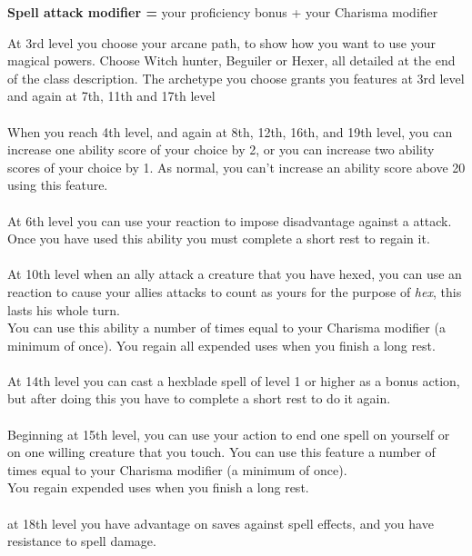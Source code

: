 \documentclass[a4paper]{article}
\begin{document}
\begin{multicols}{2}
\begin{center}
\textbf{Spell attack modifier =} your proficiency bonus + your Charisma modifier\\
\end{center} 
At 3rd level you choose your arcane path, to show how you want to use your magical powers. Choose Witch hunter, Beguiler or Hexer, all detailed at the end of the class description. The archetype you choose grants you features at 3rd level and again at 7th, 11th and 17th level\\
\\
When you reach 4th level, and again at 8th, 12th, 16th, and 19th level, you can increase one ability score of your choice by 2, or you can increase two ability scores of your choice by 1. As normal, you can’t increase an ability score above 20 using this feature.\\
\\
At 6th level you can use your reaction to impose disadvantage against a attack.\\
Once you have used this ability you must complete a short rest to regain it.\\
\\
At 10th level when an ally attack a creature that you have hexed, you can use an reaction to cause your allies attacks to count as yours for the purpose of \textit{hex}, this lasts his whole turn.\\
You can use this ability a number of times equal to your Charisma modifier (a minimum of once). You regain all expended uses when you finish a long rest.\\
\\
At 14th level you can cast a hexblade spell of level 1 or higher as a bonus action, but after doing this you have to complete a short rest to do it again.\\
\\
Beginning at 15th level, you can use your action to end one spell on yourself or on one willing creature that you touch. You can use this feature a number of times equal to your Charisma modifier (a minimum of once).\\
You regain expended uses when you finish a long rest.\\
\\
at 18th level you have advantage on saves against spell effects, and you have resistance to spell damage.\\

\end{multicols}
\end{document}
